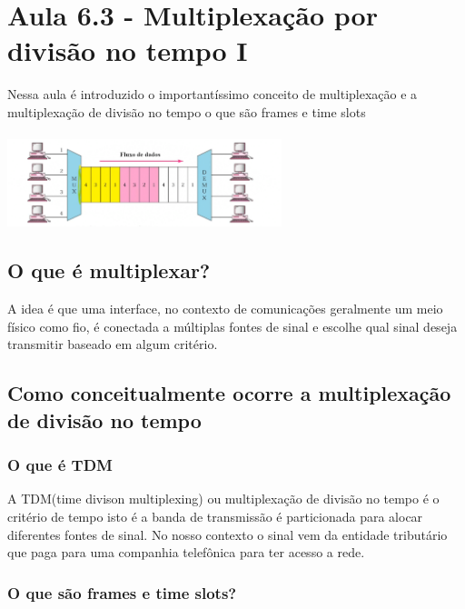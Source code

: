 
\section{Aula 6.3 - Multiplexação por divisão no tempo I}

Nessa aula é introduzido o importantíssimo conceito de multiplexação e a multiplexação de divisão no tempo o que são frames e time slots
\\\\
\includegraphics[width=0.6\textwidth]{../assets/muxte.png}

\subsection{O que é multiplexar?}

A idea é que uma interface, no contexto de comunicações geralmente um meio físico como fio, é conectada a múltiplas fontes de sinal e escolhe qual sinal deseja transmitir
baseado em algum critério.


\subsection{Como conceitualmente ocorre a multiplexação de divisão no tempo}

\subsubsection{O que é TDM}
A TDM(time divison multiplexing) ou multiplexação de divisão no tempo é o critério de tempo isto é a banda de transmissão é particionada para alocar diferentes fontes de sinal.
No nosso contexto o sinal vem da entidade tributário que paga para uma companhia telefônica para ter acesso a rede.

\subsubsection{O que são frames e time slots?}

